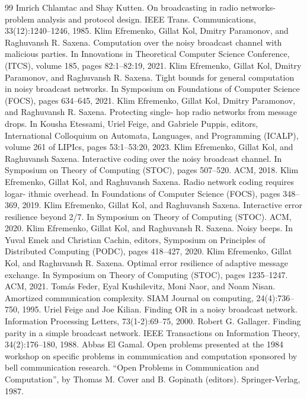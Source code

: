 \begin{thebibliography}{99}
 Imrich Chlamtac and Shay Kutten. On broadcasting in radio networks-problem analysis and protocol design. IEEE Trans. Communications, 33(12):1240–1246, 1985.
 Klim Efremenko, Gillat Kol, Dmitry Paramonov, and Raghuvansh R. Saxena. Computation over the noisy broadcast channel with malicious parties. In Innovations in Theoretical Computer Science Conference, (ITCS), volume 185, pages 82:1–82:19, 2021.
 Klim Efremenko, Gillat Kol, Dmitry Paramonov, and Raghuvansh R. Saxena. Tight bounds for general computation in noisy broadcast networks. In Symposium on Foundations of Computer Science (FOCS), pages 634–645, 2021.
 Klim Efremenko, Gillat Kol, Dmitry Paramonov, and Raghuvansh R. Saxena. Protecting single- hop radio networks from message drops. In Kousha Etessami, Uriel Feige, and Gabriele Puppis, editors, International Colloquium on Automata, Languages, and Programming (ICALP), volume 261 of LIPIcs, pages 53:1–53:20, 2023.
 Klim Efremenko, Gillat Kol, and Raghuvansh Saxena. Interactive coding over the noisy broadcast channel. In Symposium on Theory of Computing (STOC), pages 507–520. ACM, 2018.
 Klim Efremenko, Gillat Kol, and Raghuvansh Saxena. Radio network coding requires logar- ithmic overhead. In Foundations of Computer Science (FOCS), pages 348–369, 2019.
 Klim Efremenko, Gillat Kol, and Raghuvansh Saxena. Interactive error resilience beyond 2/7. In Symposium on Theory of Computing (STOC). ACM, 2020.
 Klim Efremenko, Gillat Kol, and Raghuvansh R. Saxena. Noisy beeps. In Yuval Emek and Christian Cachin, editors, Symposium on Principles of Distributed Computing (PODC), pages 418–427, 2020.
 Klim Efremenko, Gillat Kol, and Raghuvansh R. Saxena. Optimal error resilience of adaptive message exchange. In Symposium on Theory of Computing (STOC), pages 1235–1247. ACM, 2021.
 Tomás Feder, Eyal Kushilevitz, Moni Naor, and Noam Nisan. Amortized communication complexity. SIAM Journal on computing, 24(4):736–750, 1995.
 Uriel Feige and Joe Kilian. Finding OR in a noisy broadcast network. Information Processing Letters, 73(1-2):69–75, 2000.
 Robert G. Gallager. Finding parity in a simple broadcast network. IEEE Transactions on Information Theory, 34(2):176–180, 1988.
 Abbas El Gamal. Open problems presented at the 1984 workshop on specific problems in communication and computation sponsored by bell communication research. “Open Problems in Communication and Computation”, by Thomas M. Cover and B. Gopinath (editors). Springer-Verlag, 1987.

\end{thebibliography}
